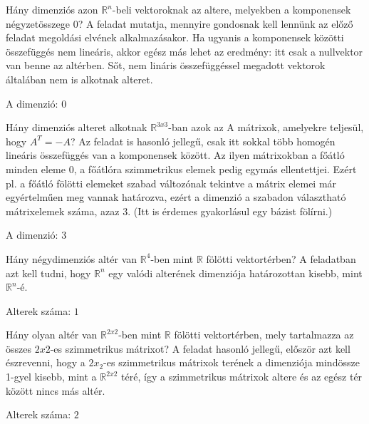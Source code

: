 \begin{frame}
  \begin{tcolorbox}[title={4/4. {\symrook}}]
      Hány dimenziós azon $\mathbb{R}^n$-beli vektoroknak az altere, melyekben a komponensek négyzetösszege $0$?
  \tcblower
    A feladat mutatja, mennyire gondosnak kell lennünk az előző feladat megoldási elvének alkalmazásakor. Ha ugyanis a komponensek közötti összefüggés nem lineáris, akkor egész más lehet az eredmény: itt csak a nullvektor van benne az altérben. Sőt, nem lináris összefüggéssel megadott vektorok általában nem is alkotnak alteret.\\
    \mmedskip 
    
    A dimenzió: $0$
  \end{tcolorbox}
\end{frame}


\begin{frame}
  \begin{tcolorbox}[title={4/5. {\symqueen}}]
      Hány dimenziós alteret alkotnak $\mathbb{R}^{3 x 3}$-ban azok az A mátrixok, amelyekre teljesül, hogy $A^T = -A$?
  \tcblower
    Az feladat is hasonló jellegű, csak itt sokkal több homogén lineáris összefüggés van a komponensek között. Az ilyen mátrixokban a főátló minden eleme 0, a főátlóra szimmetrikus elemek pedig egymás ellentettjei. Ezért pl. a főátló fölötti elemeket szabad változónak tekintve a mátrix elemei már egyértelműen meg vannak határozva, ezért a dimenzió a szabadon választható mátrixelemek száma, azaz 3. (Itt is érdemes gyakorlásul egy bázist fölírni.)\\
    \mmedskip 
    
    A dimenzió: $3$
  \end{tcolorbox}
\end{frame}


\begin{frame}
  \begin{tcolorbox}[title={4/6. {\symrook}}]
      Hány négydimenziós altér van $\mathbb{R}^4$-ben mint $\mathbb{R}$ fölötti vektortérben?
  \tcblower
    A feladatban azt kell tudni, hogy $\mathbb{R}^n$ egy valódi alterének dimenziója határozottan kisebb, mint $\mathbb{R}^n$-é.\\
    \mmedskip 
    
    Alterek száma: $1$
  \end{tcolorbox}
\end{frame}


\begin{frame}
  \begin{tcolorbox}[title={4/7. {\symqueen}}]
      Hány olyan altér van $\mathbb{R}^{2 x 2}$-ben mint $\mathbb{R}$ fölötti vektortérben, mely tartalmazza az összes $2 x 2$-es szimmetrikus mátrixot?
  \tcblower
    A feladat hasonló jellegű, először azt kell észrevenni, hogy a $2x_2$-es szimmetrikus mátrixok terének a dimenziója mindössze 1-gyel kisebb, mint a $\mathbb{R}^{2 x 2}$ téré, így a szimmetrikus mátrixok altere és az egész tér között nincs más altér.\\
    \mmedskip 
    
    Alterek száma: $2$
  \end{tcolorbox}
\end{frame}


